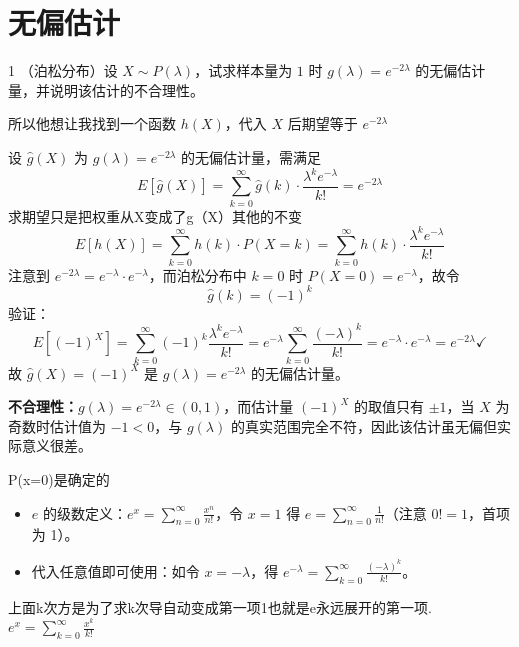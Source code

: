 \section{无偏估计}
\begin{homework}{1}
（泊松分布）设 $X \sim P(\lambda)$，试求样本量为 $1$ 时 $g(\lambda) = e^{-2\lambda}$ 的无偏估计量，并说明该估计的不合理性。
\end{homework}
\begin{dxtips}
    所以他想让我找到一个函数 $h(X)$，代入 $X$ 后期望等于 $e^{-2\lambda}$
\end{dxtips}
\begin{solution}
设 $\hat{g}(X)$ 为 $g(\lambda) = e^{-2\lambda}$ 的无偏估计量，需满足
\[
E[\hat{g}(X)] = \sum_{k=0}^{\infty} \hat{g}(k) \cdot \frac{\lambda^k e^{-\lambda}}{k!} = e^{-2\lambda}
\]
求期望只是把权重从X变成了g（X）其他的不变
\[
E[h(X)] = \sum_{k=0}^{\infty} h(k) \cdot P(X=k) = \sum_{k=0}^{\infty} h(k) \cdot \frac{\lambda^k e^{-\lambda}}{k!}
\]
注意到 $e^{-2\lambda} = e^{-\lambda} \cdot e^{-\lambda}$，而泊松分布中 $k=0$ 时 $P(X=0) = e^{-\lambda}$，故令
\[
\hat{g}(k) = (-1)^k
\]
验证：
\[
E[(-1)^X] = \sum_{k=0}^{\infty} (-1)^k \frac{\lambda^k e^{-\lambda}}{k!} = e^{-\lambda}\sum_{k=0}^{\infty} \frac{(-\lambda)^k}{k!} = e^{-\lambda} \cdot e^{-\lambda} = e^{-2\lambda} \checkmark
\]
故 $\hat{g}(X) = (-1)^X$ 是 $g(\lambda) = e^{-2\lambda}$ 的无偏估计量。

\textbf{不合理性：}$g(\lambda) = e^{-2\lambda} \in (0,1)$，而估计量 $(-1)^X$ 的取值只有 $\pm 1$，当 $X$ 为奇数时估计值为 $-1 < 0$，与 $g(\lambda)$ 的真实范围完全不符，因此该估计虽无偏但实际意义很差。
\end{solution}
\begin{note}
    P(x=0)是确定的
\end{note}
\begin{dxtips}
\begin{itemize}
    \item $e$ 的级数定义：$e^x = \sum_{n=0}^{\infty} \frac{x^n}{n!}$，令 $x=1$ 得 $e = \sum_{n=0}^{\infty} \frac{1}{n!}$（注意 $0!=1$，首项为 1）。
    \item 代入任意值即可使用：如令 $x = -\lambda$，得 $e^{-\lambda} = \sum_{k=0}^{\infty} \frac{(-\lambda)^k}{k!}$。
\end{itemize}
\end{dxtips}
\begin{dxtips}[看见阶乘求和的时候就要想e]
上面k次方是为了求k次导自动变成第一项1也就是e永远展开的第一项.$
e^x = \sum_{k=0}^{\infty} \frac{x^k}{k!}$
\end{dxtips}
